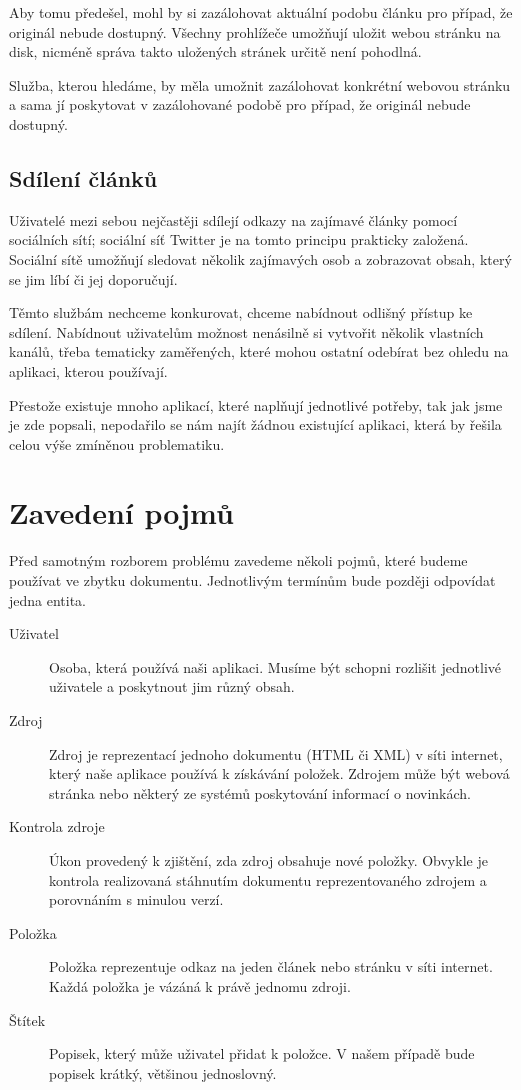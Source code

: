 Aby tomu předešel, mohl by si zazálohovat aktuální podobu článku pro případ, že originál nebude dostupný.
Všechny prohlížeče umožňují uložit webou stránku na disk, nicméně správa takto uložených stránek určitě není pohodlná.

Služba, kterou hledáme, by měla umožnit zazálohovat konkrétní webovou stránku a sama jí poskytovat v zazálohované podobě pro případ, že originál nebude dostupný.

\subsection{Sdílení článků}

Uživatelé mezi sebou nejčastěji sdílejí odkazy na zajímavé články pomocí sociálních sítí; sociální síť Twitter je na tomto principu prakticky založená.
Sociální sítě umožňují sledovat několik zajímavých osob a zobrazovat obsah, který se jim líbí či jej doporučují.

Těmto službám nechceme konkurovat, chceme nabídnout odlišný přístup ke sdílení.
Nabídnout uživatelům možnost nenásilně si vytvořit několik vlastních kanálů, třeba tematicky zaměřených, které mohou ostatní odebírat bez ohledu na aplikaci, kterou používají.

\bigskip

Přestože existuje mnoho aplikací, které naplňují jednotlivé potřeby, tak jak jsme je zde popsali, nepodařilo se nám najít žádnou existující aplikaci, která by řešila celou výše zmíněnou problematiku.

\section{Zavedení pojmů}

Před samotným rozborem problému zavedeme několi pojmů, které budeme používat ve zbytku dokumentu.
Jednotlivým termínům bude později odpovídat jedna entita.

\begin{description}
    \item[Uživatel] Osoba, která používá naši aplikaci.
		Musíme být schopni rozlišit jednotlivé uživatele a poskytnout jim různý obsah.
    \item[Zdroj] Zdroj je reprezentací jednoho dokumentu (HTML či XML) v síti internet, který naše aplikace používá k získávání položek.
		Zdrojem může být webová stránka nebo některý ze systémů poskytování informací o novinkách.
	\item[Kontrola zdroje] Úkon provedený k zjištění, zda zdroj obsahuje nové položky.
		Obvykle je kontrola realizovaná stáhnutím dokumentu reprezentovaného zdrojem a porovnáním s minulou verzí.
    \item[Položka] Položka reprezentuje odkaz na jeden článek nebo stránku v síti internet.
		Každá položka je vázáná k právě jednomu zdroji.
    \item[Štítek] Popisek, který může uživatel přidat k položce.
		V našem případě bude popisek krátký, většinou jednoslovný.
\end{description}

